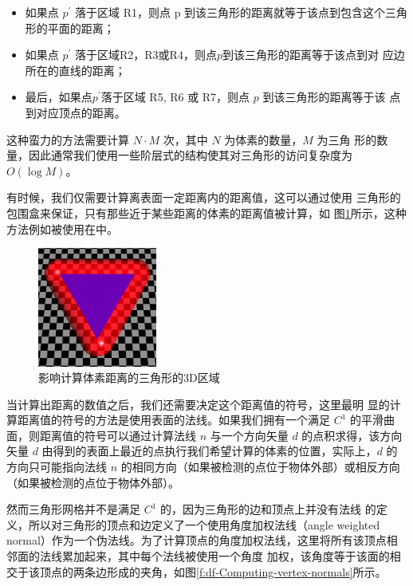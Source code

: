 \begin{itemize}
	\item 如果点 $p^{'}$ 落于区域 R1，则点 p 到该三角形的距离就等于该点到包含这个三角形的平面的距离；
	\item 如果点 $p^{'}$ 落于区域R2，R3或R4，则点$p$到该三角形的距离等于该点到对 应边所在的直线的距离；
	\item 最后，如果点$p^{'}$落于区域 R5, R6 或 R7，则点 $p$ 到该三角形的距离等于该 点到对应顶点的距离。
\end{itemize}

这种蛮力的方法需要计算 $N \cdot M$ 次，其中 $N$ 为体素的数量，$M$ 为三角 形的数量，因此通常我们使用一些阶层式的结构使其对三角形的访问复杂度为 $O(\log M )$。

有时候，我们仅需要计算离表面一定距离内的距离值，这可以通过使用 三角形的包围盒来保证，只有那些近于某些距离的体素的距离值被计算，如 图\ref{f:df-close-triangle}所示，这种方法例如被使用在\cite{a:Incremental-Triangle-Voxelization}中。

\begin{figure}
	\sidecaption
	\includegraphics[width=0.35\textwidth]{figures/df/close-triangle}
	\caption{影响计算体素距离的三角形的3D区域}
	\label{f:df-close-triangle}
\end{figure}

当计算出距离的数值之后，我们还需要决定这个距离值的符号，这里最明 显的计算距离值的符号的方法是使用表面的法线。如果我们拥有一个满足 $C^{1}$ 的平滑曲面，则距离值的符号可以通过计算法线 $n$ 与一个方向矢量 $d$ 的点积求得，该方向矢量 $d$ 由得到的表面上最近的点执行我们希望计算的体素的位置，实际上，$d$ 的方向只可能指向法线 $n$ 的相同方向（如果被检测的点位于物体外部）或相反方向（如果被检测的点位于物体外部）。

然而三角形网格并不是满足 $C^{1}$ 的，因为三角形的边和顶点上并没有法线 的定义，所以\cite{a:3d-distance-fields-a-survey}对三角形的顶点和边定义了一个使用角度加权法线（angle weighted normal）作为一个伪法线。为了计算顶点的角度加权法线，这里将所有该顶点相邻面的法线累加起来，其中每个法线被使用一个角度 加权，该角度等于该面的相交于该顶点的两条边形成的夹角，如图\ref{f:df-Computing-vertex-normals}所示。

